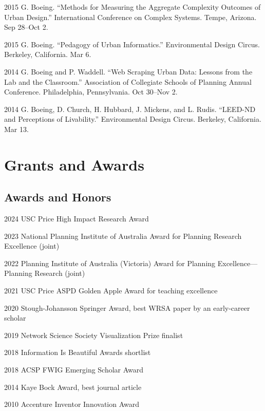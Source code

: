 \documentclass[11pt,letterpaper]{report}
\begin{document}
\begin{tablist}
        \item[2015] \tab{}G. Boeing. \enquote{Methods for Measuring the Aggregate Complexity Outcomes of Urban Design.} International Conference on Complex Systems. Tempe, Arizona. Sep 28--Oct 2.

        \item[2015] \tab{}G. Boeing. \enquote{Pedagogy of Urban Informatics.} Environmental Design Circus. Berkeley, California. Mar 6.

        \item[2014] \tab{}G. Boeing and P. Waddell. \enquote{Web Scraping Urban Data: Lessons from the Lab and the Classroom.} Association of Collegiate Schools of Planning Annual Conference. Philadelphia, Pennsylvania. Oct 30--Nov 2.

        \item[2014] \tab{}G. Boeing, D. Church, H. Hubbard, J. Mickens, and L. Rudis. \enquote{LEED-ND and Perceptions of Livability.} Environmental Design Circus. Berkeley, California. Mar 13.

    \end{tablist}



    \section*{Grants and Awards}

    \subsection*{Awards and Honors}

    \begin{tablist}

        \item[2024] \tab{}USC Price High Impact Research Award
        \item[2023] \tab{}National Planning Institute of Australia Award for Planning Research Excellence (joint)
        \item[2022] \tab{}Planning Institute of Australia (Victoria) Award for Planning Excellence---Planning Research (joint)
        \item[2021] \tab{}USC Price ASPD Golden Apple Award for teaching excellence
        \item[2020] \tab{}Stough-Johansson Springer Award, best WRSA paper by an early-career scholar
        \item[2019] \tab{}Network Science Society Visualization Prize finalist
        \item[2018] \tab{}Information Is Beautiful Awards shortlist
        \item[2018] \tab{}ACSP FWIG Emerging Scholar Award
        \item[2014] \tab{}Kaye Bock Award, best journal article
        \item[2010] \tab{}Accenture Inventor Innovation Award

    \end{tablist}
\end{document}
